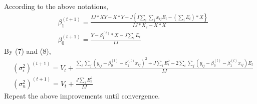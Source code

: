 \documentclass{article}
\begin{document}
		According to the above notations, 
		\begin{align*}
			&\beta_1^{(t+1)} = \frac{IJ*XY - X*Y - J\left\{ I\sum_i \sum_j x_{ij}E_t - (\sum_i E_t)*X \right\}}{IJ*X_2 - X*X}\\[10pt]
			&\beta_0^{(t+1)} = \frac{Y - \beta_1^{(t)}*X - J \sum_i E_t}{IJ}
		\end{align*}
		By (7) and (8), 
		\begin{align*}
			&(\sigma_\epsilon^2)^{(t+1)} = V_t + \frac{\sum_i \sum_j (y_{ij} - \beta_0^{(t)} - \beta_1^{(t)}x_{ij})^2 + J \sum_i E_t^2 - 2\sum_i \sum_j (y_{ij} - \beta_0^{(t)} - \beta_1^{(t)}x_{ij})E_t}{IJ}\\[10pt]
			&(\sigma_u^2)^{(t+1)} = V_t + \frac{J\sum_i E_t^2}{IJ}
		\end{align*}
		Repeat the above improvements until convergence.
	\subsection{}
		
\end{document}
